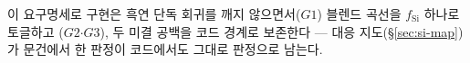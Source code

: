 이 요구명세로 구현은 흑연 단독 회귀를 깨지 않으면서($G1$) 블렌드 곡선을 $f_\mathrm{Si}$ 하나로 토글하고
($G2$$\cdot$$G3$), 두 미결 공백을 코드 경계로 보존한다 --- 대응 지도(\S\ref{sec:si-map})가 문건에서
한 판정이 코드에서도 그대로 판정으로 남는다.

